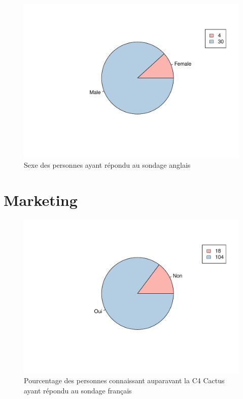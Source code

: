 \documentclass[12pt]{article}\usepackage[]{graphicx}\usepackage[]{color}
\makeatletter
\def\maxwidth{ %
  \ifdim\Gin@nat@width>\linewidth
    \linewidth
  \else
    \Gin@nat@width
  \fi
}
\newenvironment{knitrout}{}{} %
\makeatother
\begin{document}
\begin{knitrout}
\color{fgcolor}\begin{figure}[H]
\includegraphics[width=\maxwidth]{figure/sexe_en-1} \caption[Sexe des personnes ayant répondu au sondage anglais]{Sexe des personnes ayant répondu au sondage anglais}\label{fig:sexe en}
\end{figure}


\end{knitrout}

\section{Marketing}

\begin{knitrout}
\color{fgcolor}\begin{figure}[H]
\includegraphics[width=\maxwidth]{figure/know_fr-1} \caption[Pourcentage des personnes connaissant auparavant la C4 Cactus ayant répondu au sondage français]{Pourcentage des personnes connaissant auparavant la C4 Cactus ayant répondu au sondage français}\label{fig:know fr}
\end{figure}


\end{knitrout}
\end{document}

